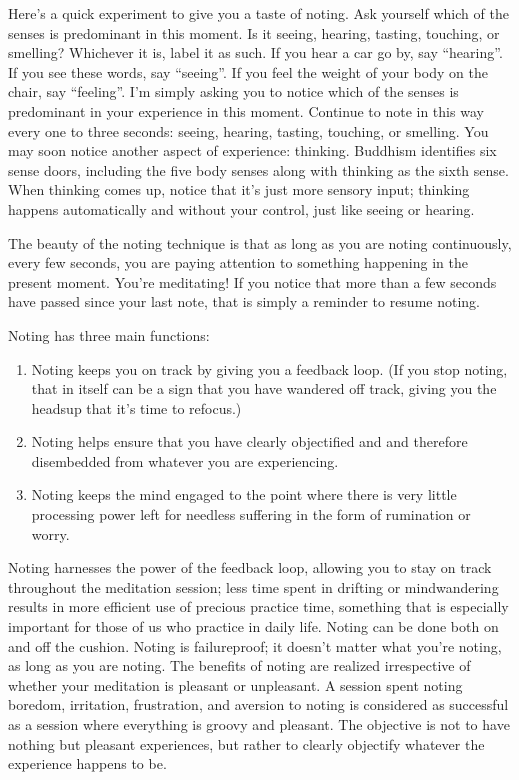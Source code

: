 \documentclass[a5paper,10pt,english]{book}
\begin{document}
\sphinxAtStartPar
Here’s a quick experiment to give you a taste of noting. Ask yourself
which of the senses is predominant in this moment. Is it seeing,
hearing, tasting, touching, or smelling? Whichever it is, label it as
such. If you hear a car go by, say “hearing”. If you see these words,
say “seeing”. If you feel the weight of your body on the chair, say
“feeling”. I’m simply asking you to notice which of the senses is
predominant in your experience in this moment. Continue to note in this
way every one to three seconds: seeing, hearing, tasting, touching, or
smelling. You may soon notice another aspect of experience: thinking.
Buddhism identifies six sense doors, including the five body senses
along with thinking as the sixth sense. When thinking comes up, notice
that it’s just more sensory input; thinking happens automatically and
without your control, just like seeing or hearing.

\sphinxAtStartPar
The beauty of the noting technique is that as long as you are noting
continuously, every few seconds, you are paying attention to something
happening in the present moment. You’re meditating! If you notice that
more than a few seconds have passed since your last note, that is simply
a reminder to resume noting.

\sphinxAtStartPar
Noting has three main functions:
\begin{enumerate}
%
\item {} 
\sphinxAtStartPar
Noting keeps you on track by giving
you a feedback loop. (If you stop noting, that in itself can be a sign
that you have wandered off track, giving you the heads\sphinxhyphen{}up that it’s time
to refocus.)

\item {} 
\sphinxAtStartPar
Noting helps ensure that you have clearly objectified
and and therefore dis\sphinxhyphen{}embedded from whatever you are experiencing.

\item {} 
\sphinxAtStartPar
Noting keeps the mind engaged to the point where there is very little
processing power left for needless suffering in the form of rumination
or worry.

\end{enumerate}

\sphinxAtStartPar
Noting harnesses the power of the feedback loop, allowing you to stay on
track throughout the meditation session; less time spent in drifting or
mind\sphinxhyphen{}wandering results in more efficient use of precious practice time,
something that is especially important for those of us who practice in
daily life. Noting can be done both on and off the cushion. Noting is
failure\sphinxhyphen{}proof; it doesn’t matter what you’re noting, as long as you are
noting. The benefits of noting are realized irrespective of whether your
meditation is pleasant or unpleasant. A session spent noting boredom,
irritation, frustration, and aversion to noting is considered as
successful as a session where everything is groovy and pleasant. The
objective is not to have nothing but pleasant experiences, but rather to
clearly objectify whatever the experience happens to be.
\end{document}
